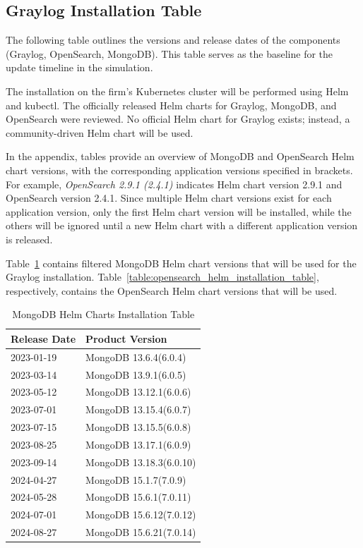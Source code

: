 \documentclass[../main.tex]{subfiles}
\begin{document}
\subsection{Graylog Installation Table}

The following table outlines the versions and release dates of the components (Graylog, OpenSearch, MongoDB). This table serves as the baseline for the update timeline in the simulation.

The installation on the firm's Kubernetes cluster will be performed using Helm and kubectl. The officially released Helm charts for Graylog, MongoDB, and OpenSearch were reviewed. No official Helm chart for Graylog exists; instead, a community-driven Helm chart will be used.  

In the appendix, tables provide an overview of MongoDB and OpenSearch Helm chart versions, with the corresponding application versions specified in brackets. For example, \textit{OpenSearch 2.9.1 (2.4.1)} indicates Helm chart version 2.9.1 and OpenSearch version 2.4.1. Since multiple Helm chart versions exist for each application version, only the first Helm chart version will be installed, while the others will be ignored until a new Helm chart with a different application version is released.

Table~\ref{table:mongodb_helm_installation_table} contains filtered MongoDB Helm chart versions that will be used for the Graylog installation. Table~\ref{table:opensearch_helm_installation_table}, respectively, contains the OpenSearch Helm chart versions that will be used.

\begin{table}[h]
\centering
\begin{tabular}{|l|l|}
\hline
\textbf{Release Date} & \textbf{Product Version} \\ \hline
2023-01-19 & MongoDB 13.6.4(6.0.4) \\ \hline
2023-03-14 & MongoDB 13.9.1(6.0.5) \\ \hline
2023-05-12 & MongoDB 13.12.1(6.0.6) \\ \hline
2023-07-01 & MongoDB 13.15.4(6.0.7) \\ \hline
2023-07-15 & MongoDB 13.15.5(6.0.8) \\ \hline
2023-08-25 & MongoDB 13.17.1(6.0.9) \\ \hline
2023-09-14 & MongoDB 13.18.3(6.0.10) \\ \hline
2024-04-27 & MongoDB 15.1.7(7.0.9) \\ \hline
2024-05-28 & MongoDB 15.6.1(7.0.11) \\ \hline
2024-07-01 & MongoDB 15.6.12(7.0.12) \\ \hline
2024-08-27 & MongoDB 15.6.21(7.0.14) \\ \hline
\end{tabular}
\caption{MongoDB Helm Charts Installation Table}
\label{table:mongodb_helm_installation_table}
\end{table}
\end{document}

